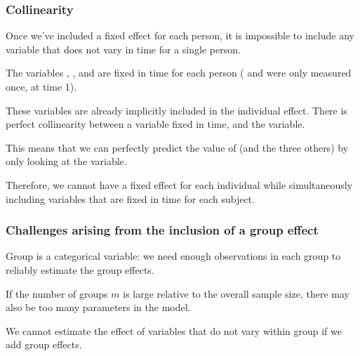 \documentclass{beamer}
\begin{document}
\begin{frame}[fragile]
\frametitle{Collinearity}
\bi
\item  Once we've included a fixed effect for each person, \alert{it is impossible to include any variable that does not vary in time for a single person}. 
\item The variables , ,  and  are fixed in time for each person ( and  were only measured once, at time 1). 
\item These variables are already implicitly included in the individual effect. There is \alert{perfect collinearity} between a variable fixed in time, and the  variable. 
\item This means that we can perfectly predict the value of  (and the three others) by only looking at the  variable. 
\item Therefore, we cannot have a fixed effect for each individual while simultaneously including variables that are fixed in time for each subject.
\ei
\end{frame}
 \begin{frame}
 \frametitle{Challenges arising from the inclusion of a group effect}
 
 \bi 
 \item Group is a categorical variable: we need enough observations in each group to reliably estimate the group effects.
 \item If the number of groups $m$ is large relative to the overall sample size, there may also be too many parameters in the model. 
 \item We cannot estimate the effect of variables that do not vary within group if we add group effects.
  \ei
\end{frame}


% 
\end{document}
